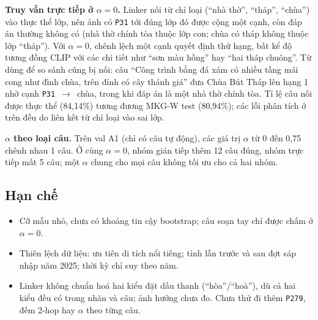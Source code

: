 \textbf{Truy vấn trực tiếp ở $\alpha=0$.} Linker nối từ chỉ loại (``nhà thờ'', ``tháp'',
``chùa'') vào thực thể lớp, nên ảnh có \texttt{P31} tới đúng lớp đó được cộng một cạnh, còn đáp án thường không có
(nhà thờ chính tòa thuộc lớp con; chùa có tháp không thuộc lớp ``tháp''). Với $\alpha=0$, chênh lệch một cạnh quyết
định thứ hạng, bất kể độ tương đồng CLIP với các chi tiết như ``sơn màu hồng'' hay ``hai tháp chuông''. Từ dùng để so sánh cũng bị nối: câu ``Công trình bằng
đá xám có nhiều tầng mái cong như đình chùa, trên đỉnh có cây thánh giá'' đưa Chùa Bút Tháp lên hạng 1 nhờ cạnh
\texttt{P31}~$\rightarrow$~chùa, trong khi đáp án là một nhà thờ chính tòa. Tỉ lệ câu nối được thực thể (84,14\%)
tương đương MKG-W test (80,94\%); các lỗi phân tích ở trên đều do liên kết từ chỉ loại vào sai lớp.

\textbf{$\alpha$ theo loại câu.} Trên val A1 (chỉ có câu tự động), các giá trị $\alpha$ từ 0 đến 0{,}75 chênh nhau 1
câu. Ở cùng $\alpha=0$, nhóm gián tiếp thêm 12 câu đúng, nhóm trực tiếp mất 5 câu; một $\alpha$ chung cho mọi câu không
tối ưu cho cả hai nhóm.

\subsection{Hạn chế}\label{sec:vn-limits}

\begin{itemize}
\item Cỡ mẫu nhỏ, chưa có khoảng tin cậy bootstrap; câu soạn tay chỉ được chấm ở $\alpha=0$.
\item Thiên lệch dữ liệu: ưu tiên di tích nổi tiếng; tỉnh lẫn trước và sau đợt sáp nhập năm 2025; thời kỳ chỉ suy
  theo năm.
\item Linker không chuẩn hoá hai kiểu đặt dấu thanh (``hòa''/``hoà''), dù cả hai kiểu đều có trong nhãn và câu;
  ảnh hưởng chưa đo. Chưa thử đi thêm \texttt{P279}, đếm 2-hop hay $\alpha$ theo từng câu.
\end{itemize}
